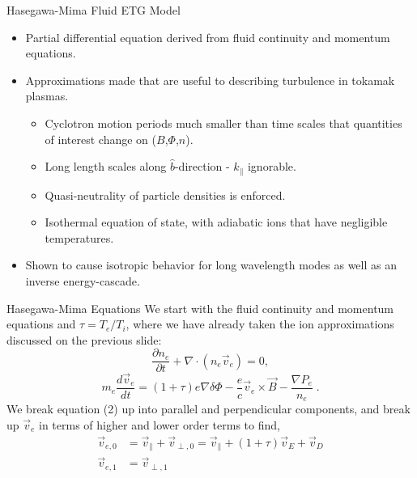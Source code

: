 \documentclass[aspectratio=43]{beamer}
\begin{document}
   \begin{frame}{Hasegawa-Mima Fluid ETG Model}
      \begin{itemize}
         \item Partial differential equation derived from fluid continuity and momentum equations.
         \item Approximations made that are useful to describing  turbulence in tokamak plasmas.
         \begin{itemize}
            \item Cyclotron motion periods much smaller than time scales that quantities of interest change on ($B$,$\Phi$,$n$).
            \item Long length scales along $\hat{b}$-direction - $k_{\parallel}$ ignorable.
            \item Quasi-neutrality of particle densities is enforced.
            \item Isothermal equation of state, with adiabatic ions that have negligible temperatures.
         \end{itemize}
         \item Shown to cause isotropic behavior for long wavelength modes as well as an inverse energy-cascade.
      \end{itemize}
   \end{frame}

   \begin{frame}{Hasegawa-Mima Equations}
      \quad We start with the fluid continuity and momentum equations and $\tau = T_e/T_i$, where we have already taken the ion approximations discussed
   on the previous slide:
      \begin{equation}
         \frac{\partial n_e}{\partial t} + \nabla\cdot\left(n_e\vec{v}_e\right) = 0,
      \end{equation}
      \begin{equation}
            m_e\frac{d\vec{v}_e}{dt} = \left(1+\tau\right)e\nabla\delta\Phi - \frac{e}{c}\vec{v}_e\times\vec{B}-\frac{\nabla P_e}{n_e}\;.
      \end{equation}
   We break equation (2) up into parallel and perpendicular components, and break up $\vec{v}_e$ in terms of higher and lower order terms to find,
      \begin{equation}
      \begin{aligned}
         \vec{v}_{e,0} &= \vec{v}_{\parallel} + \vec{v}_{\perp,0} = \vec{v}_{\parallel} + \left(1 + \tau\right)\vec{v}_E + \vec{v}_D \\
         \vec{v}_{e,1} &= \vec{v}_{\perp,1}
      \end{aligned}
      \end{equation}
   \end{frame}
\end{document}
